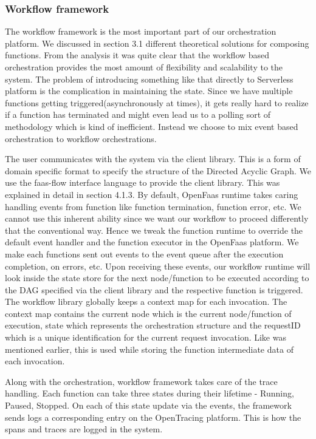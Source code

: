 \documentclass[12pt,titlepage]{article}
\begin{document}
\subsubsection{Workflow framework}
\label{sec:orga986456}
The workflow framework is the most important part of our orchestration platform.
We discussed in section 3.1 different theoretical solutions for composing
functions. From the analysis it was quite clear that the workflow based
orchestration provides the most amount of flexibility and scalability to the
system. The problem of introducing something like that directly to Serverless
platform is the complication in maintaining the state. Since we have multiple
functions getting triggered(asynchronously at times), it gets really hard to
realize if a function has terminated and might even lead us to a polling sort of
methodology which is kind of inefficient. Instead we choose to mix event based
orchestration to workflow orchestrations.

The user communicates with the system via the client library. This is a form of
domain specific format to specify the structure of the Directed Acyclic Graph.
We use the faas-flow interface language to provide the client library. This was
explained in detail in section 4.1.3. By default, OpenFaas runtime takes caring handling events from function like
function termination, function error, etc. We cannot use this inherent ability
since we want our workflow to proceed differently that the conventional way.
Hence we tweak the function runtime to override the default event handler and
the function executor in the OpenFaas platform. We make each functions sent out
events to the event queue after the execution completion, on errors, etc. Upon
receiving these events, our workflow runtime will look inside the state store
for the next node/function to be executed according to the DAG specified via the
client library and the respective function is triggered. The workflow library
globally keeps a context map for each invocation. The context map contains the
current node which is the current node/function of execution, state which
represents the orchestration structure and the requestID which is a unique
identification for the current request invocation. Like was mentioned earlier,
this is used while storing the function intermediate data of each invocation.

Along with the orchestration, workflow framework takes care of the trace
handling. Each function can take three states during their lifetime - Running,
Paused, Stopped. On each of this state update via the events, the framework
sends logs a corresponding entry on the OpenTracing platform. This is how the
spans and traces are logged in the system.
\end{document}
